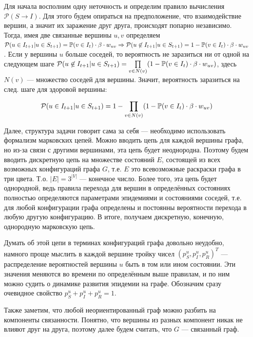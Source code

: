 	Для начала восполним одну неточность и определим правило вычисления $\mathcal{P}(S \rightarrow I)$. Для этого будем опираться на предположение, что взаимодействие вершин, а значит их заражение друг друга, происходят попарно независимо. Тогда, имея две связанные вершины $u, v$ определяем $\mathcal{P}(u \in I_{t+1} | u \in S_{t+1}) = \mathbb{P}(v \in I_t) \cdot \beta \cdot w_{uv} \Rightarrow \mathcal{P}(u \not \in I_{t+1} | u \in S_{t+1}) = 1 - \mathbb{P}(v \in I_t) \cdot \beta \cdot w_{uv} $. Если у вершины $u$ больше соседей, то вероятность не заразиться ни от одной на следующем шаге $\mathcal{P}(u \not \in I_{t+1} | u \in S_{t+1}) = \prod\limits_{v \in N(v)} (1 - \mathbb{P}(v \in I_t) \cdot \beta \cdot w_{uv}) $, здесь $N(v)$ --- множество соседей для вершины. Значит, вероятность заразиться на след. шаге для здоровой вершины:
	
	\begin{equation}
		\mathcal{P}(u \in I_{t+1} | u \in S_{t+1}) = 1 - \prod\limits_{v \in N(v)} (1 - \mathbb{P}(v \in I_t) \cdot \beta \cdot w_{uv})
	\end{equation}
	
	Далее, структура задачи говорит сама за себя --- необходимо использовать формализм марковских цепей. Можно вводить цепь для каждой вершины графа, но из-за связи с другими вершинами, эта цепь будет неоднородна. Поэтому будем вводить дискретную цепь на множестве состояний $E$, состоящей из всех возможных конфигураций графа $G$, т.е. $E$ это всевозможные раскраски графа в три цвета. Т.о. $ \lvert E \rvert = 3^{|V|} $ --- конечное число. Более того, эта цепь будет однородной, ведь правила перехода для вершин в определённых состояниях полностью определяются параметрами эпидемиями и состояниями соседей, т.е. для любой конфигурации графа определены и постоянны вероятности перехода в любую другую конфигурацию. В итоге, получаем дискретную, конечную, однородную марковскую цепь.
	
	Думать об этой цепи в терминах конфигураций графа довольно неудобно, намного проще мыслить в каждой вершине тройку чисел $(p_S^u, p_I^u, p_R^u)^T$ --- \hypertarget{ver_distr}{распределение вероятностей} вершины $u$ быть в том или ином состоянии. Эти значения меняются во времени по определённым выше правилам, и по ним можно судить о динамике развития эпидемии на графе. Обозначим сразу очевидное свойство $p_S^u + p_I^u + p_R^u = 1$.
	
	Также заметим, что любой неориентированный граф можно разбить на компоненты связанности. Понятно, что вершины из разных компонент никак не влияют друг на друга, поэтому далее будем считать, что $G$ --- связанный граф.
	
